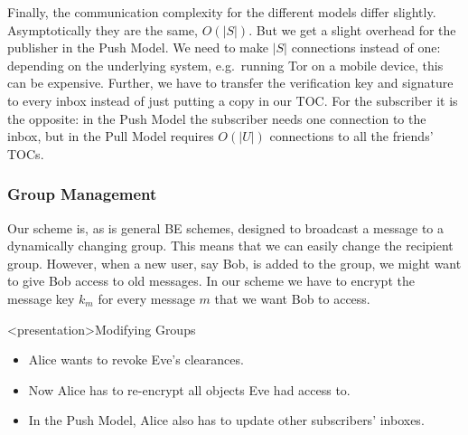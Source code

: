 Finally, the communication complexity for the different models differ slightly.
Asymptotically they are the same, \(O(|S|)\).
But we get a slight overhead for the publisher in the Push Model.
We need to make \(|S|\) connections instead of one: depending on the underlying 
system, e.g.\ running Tor on a mobile device, this can be expensive.
Further, we have to transfer the verification key and signature to every inbox 
instead of just putting a copy in our \ac{TOC}.
For the subscriber it is the opposite: in the Push Model the subscriber needs 
one connection to the inbox, but in the Pull Model requires \(O(|U|)\) 
connections to all the friends' \acp{TOC}.

\subsubsection{Group Management}\label{GroupManagement}


Our scheme is, as is general \ac{BE} schemes, designed to broadcast a message 
to a dynamically changing group.
This means that we can easily change the recipient group.
However, when a new user, say Bob, is added to the group, we might want to give 
Bob access to old messages.
In our scheme we have to encrypt the message key \(k_m\) for every message 
\(m\) that we want Bob to access.

\begin{frame}<presentation>{Modifying Groups}
  \begin{itemize}
    \item Alice wants to revoke Eve's clearances.

      \pause{}

    \item Now Alice has to re-encrypt all objects Eve had access to.

    \item In the Push Model, Alice also has to update other subscribers' 
      inboxes.

  \end{itemize}
\end{frame}

